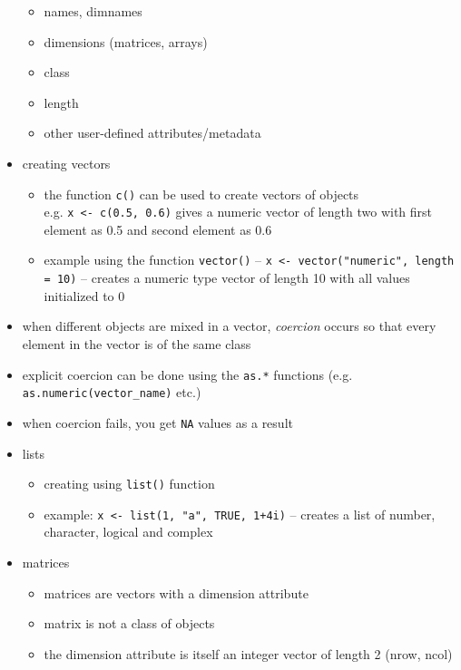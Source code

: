 \documentclass[11pt,fancy]{elegantbook}
\begin{document}
\begin{itemize}
          \begin{itemize}
              \item names, dimnames
              \item dimensions (matrices, arrays)
              \item class
              \item length
              \item other user-defined attributes/metadata
          \end{itemize}
    \item creating vectors
          \begin{itemize}
              \item the function \texttt{c()} can be used to create vectors of objects
                    \\ e.g. \texttt{x <- c(0.5, 0.6)} gives a numeric vector of length two with first element as 0.5 and second element as 0.6
              \item example using the function \texttt{vector()} -- \texttt{x <- vector("numeric", length = 10)} -- creates a numeric type vector of length 10 with all values initialized to 0
          \end{itemize}
    \item when different objects are mixed in a vector, \textit{coercion} occurs so that every element in the vector is of the same class
    \item explicit coercion can be done using the \texttt{as.*} functions (e.g. \texttt{as.numeric(vector\_name)} etc.)
    \item when coercion fails, you get \texttt{NA} values as a result
    \item lists
          \begin{itemize}
              \item creating using \texttt{list()} function
              \item example: \texttt{x <- list(1, "a", TRUE, 1+4i)} -- creates a list of number, character, logical and complex
          \end{itemize}
    \item matrices
          \begin{itemize}
              \item matrices are vectors with a dimension attribute
              \item matrix is not a class of objects
              \item the dimension attribute is itself an integer vector of length 2 (nrow, ncol)

\end{itemize}
\end{itemize}
\end{document}
